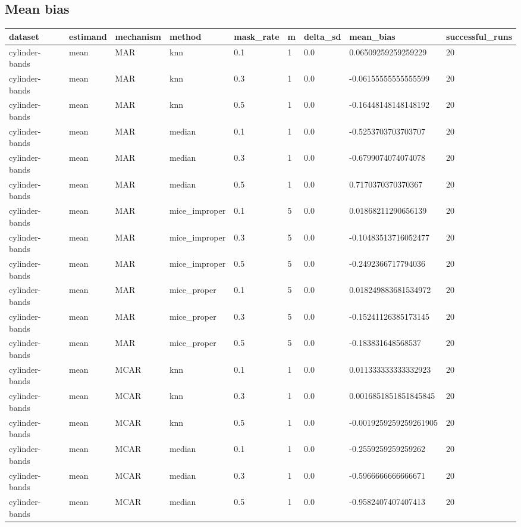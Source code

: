 \subsection*{Mean bias}

\begin{tabular}{lllllllll}
\hline
dataset & estimand & mechanism & method & mask\_rate & m & delta\_sd & mean\_bias & successful\_runs \\
\hline
cylinder-bands & mean & MAR & knn & 0.1 & 1 & 0.0 & 0.06509259259259229 & 20 \\
cylinder-bands & mean & MAR & knn & 0.3 & 1 & 0.0 & -0.06155555555555599 & 20 \\
cylinder-bands & mean & MAR & knn & 0.5 & 1 & 0.0 & -0.16448148148148192 & 20 \\
cylinder-bands & mean & MAR & median & 0.1 & 1 & 0.0 & -0.5253703703703707 & 20 \\
cylinder-bands & mean & MAR & median & 0.3 & 1 & 0.0 & -0.6799074074074078 & 20 \\
cylinder-bands & mean & MAR & median & 0.5 & 1 & 0.0 & 0.7170370370370367 & 20 \\
cylinder-bands & mean & MAR & mice\_improper & 0.1 & 5 & 0.0 & 0.01868211290656139 & 20 \\
cylinder-bands & mean & MAR & mice\_improper & 0.3 & 5 & 0.0 & -0.10483513716052477 & 20 \\
cylinder-bands & mean & MAR & mice\_improper & 0.5 & 5 & 0.0 & -0.2492366717794036 & 20 \\
cylinder-bands & mean & MAR & mice\_proper & 0.1 & 5 & 0.0 & 0.018249883681534972 & 20 \\
cylinder-bands & mean & MAR & mice\_proper & 0.3 & 5 & 0.0 & -0.15241126385173145 & 20 \\
cylinder-bands & mean & MAR & mice\_proper & 0.5 & 5 & 0.0 & -0.183831648568537 & 20 \\
cylinder-bands & mean & MCAR & knn & 0.1 & 1 & 0.0 & 0.011333333333332923 & 20 \\
cylinder-bands & mean & MCAR & knn & 0.3 & 1 & 0.0 & 0.0016851851851845845 & 20 \\
cylinder-bands & mean & MCAR & knn & 0.5 & 1 & 0.0 & -0.0019259259259261905 & 20 \\
cylinder-bands & mean & MCAR & median & 0.1 & 1 & 0.0 & -0.2559259259259262 & 20 \\
cylinder-bands & mean & MCAR & median & 0.3 & 1 & 0.0 & -0.5966666666666671 & 20 \\
cylinder-bands & mean & MCAR & median & 0.5 & 1 & 0.0 & -0.9582407407407413 & 20 \\

\end{tabular}
